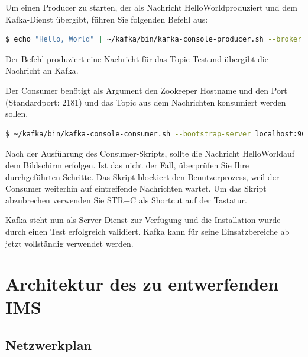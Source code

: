 \documentclass[a4paper,titlepage,halfparskip,12pt]{scrreprt}
\begin{document}
\pagebreak

Um einen Producer zu starten, der als Nachricht \glqq HelloWorld\grqq produziert und dem Kafka-Dienst übergibt, führen Sie folgenden Befehl aus:

\smallskip

\begin{lstlisting}[language=Bash]
$ echo "Hello, World" | ~/kafka/bin/kafka-console-producer.sh --broker-list localhost:9092 --topic Test > /dev/null
\end{lstlisting}

Der Befehl produziert eine Nachricht für das Topic \glqq Test\grqq und übergibt die Nachricht an Kafka.

Der Consumer benötigt als Argument den Zookeeper Hostname und den Port (Standardport: 2181) und das Topic aus dem Nachrichten konsumiert werden sollen.

\smallskip

\begin{lstlisting}[language=Bash]
$ ~/kafka/bin/kafka-console-consumer.sh --bootstrap-server localhost:9092 --topic Test --from-beginning
\end{lstlisting}

Nach der Ausführung des Consumer-Skripts, sollte die Nachricht \glqq HelloWorld\grqq auf dem Bildschirm erfolgen. Ist das nicht der Fall, überprüfen Sie Ihre durchgeführten Schritte. Das Skript blockiert den Benutzerprozess, weil der Consumer weiterhin auf eintreffende Nachrichten wartet. Um das Skript abzubrechen verwenden Sie STR+C als Shortcut auf der Tastatur.

Kafka steht nun als Server-Dienst zur Verfügung und die Installation wurde durch einen Test erfolgreich validiert. Kafka kann für seine Einsatzbereiche ab jetzt vollständig verwendet werden.

\chapter{Architektur des zu entwerfenden \ac{IMS}}

\section{Netzwerkplan}
\end{document}
